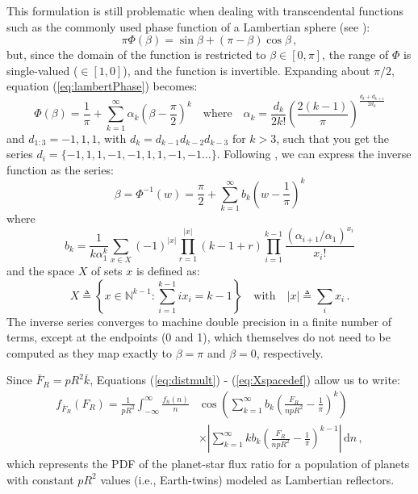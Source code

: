 This formulation is still problematic when dealing with transcendental functions such as the commonly used phase function of a Lambertian sphere (see ):
\begin{equation}\label{eq:lambertPhase}
\pi \Phi(\beta) = \sin\beta + (\pi - \beta)\cos\beta \, ,
\end{equation}
but, since the domain of the function is restricted to $\beta \in [0,\pi]$, the range of $\Phi$ is single-valued ($\in [1, 0]$), and the function is invertible.  Expanding about $\pi/2$, equation (\ref{eq:lambertPhase}) becomes:
\begin{equation}\label{eq:lambertPhaseSeries}
\Phi(\beta) = \frac{1}{\pi}  + \sum_{k=1}^{\infty} \alpha_k \left(\beta - \frac{\pi}{2}\right)^k \quad\textrm{where}\quad \alpha_k = \frac{d_k}{2 k!}\left(\frac{2 (k-1)}{\pi}\right)^{\frac{d_k + d_{k+1}}{2 d_k}}
\end{equation}
and $d_{1:3} = -1,1,1$, with $d_k = d_{k-1}d_{k-2}d_{k-3}$ for $k > 3$, such that you get the series $d_i = \{-1,1,1,-1,-1,1,1,-1,-1\ldots\}$.  Following \citet{morese1953methods}, we can express the inverse function as the series:
\begin{equation}
\beta = \Phi^{-1}(w) = \frac{\pi}{2}  + \sum_{k=1}^{\infty} b_k \left(w - \frac{1}{\pi}\right)^k 
\end{equation}
where
\begin{equation}
b_k = \frac{1}{k \alpha_1^k} \sum_{x \in X} (-1)^{\vert x \vert} \prod_{r=1}^{\vert x\vert}(k-1+r)  \prod_{i=1}^{k-1}\frac{\left(\alpha_{i+1}/\alpha_1\right)^{x_i}}{x_i!}
\end{equation}
and the space $X$ of sets $x$ is defined as:
\begin{equation}\label{eq:Xspacedef}
X \triangleq \left\{x \in \mathbb{N}^{k-1} : \sum_{i=1}^{k-1} i x_i = k-1\right\} \quad\textrm{with}\quad \vert x\vert \triangleq \sum_i x_i \,.
\end{equation}
The inverse series converges to machine double precision in a finite number of terms, except at the endpoints (0 and 1), which themselves do not need to be computed as they map exactly to $\beta = \pi$ and $\beta = 0$, respectively.

Since $\bar F_R = pR^2 \bar k$, Equations (\ref{eq:distmult}) - (\ref{eq:Xspacedef}) allow us to write:
\begin{align}
f_{\bar F_R}(F_R) = \frac{1}{pR^2}\int_{-\infty}^\infty \frac{f_{\bar{n}}(n)}{n} & \cos\left(\sum_{k=1}^{\infty} b_k \left(\frac{F_R}{npR^2} - \frac{1}{\pi}\right)^k\right)\nonumber\\
&\times \left|\sum_{k=1}^\infty k b_k \left(\frac{F_R}{npR^2} - \frac{1}{\pi}\right)^{k-1} \right| \, \mathrm{d}n \label{eq:FRpdf} \,,
\end{align}
which represents the PDF of the planet-star flux ratio for a population of planets with constant $pR^2$ values (i.e., Earth-twins) modeled as Lambertian reflectors.

